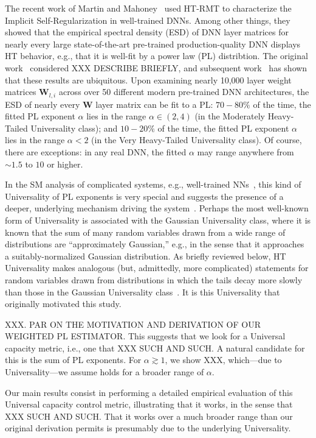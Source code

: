 The recent work of Martin and Mahoney~\cite{MM18_TR} used HT-RMT to characterize the Implicit Self-Regularization in well-trained DNNs.
Among other things, they showed that the empirical spectral density (ESD) of DNN layer matrices for nearly every large state-of-the-art pre-trained production-quality DNN displays HT behavior, e.g., that it is well-fit by a power law (PL) distribtion.
%
The original work~\cite{MM18_TR} considered 
XXX DESCRIBE BRIEFLY, 
and subsequent work~\cite{MM18_unpub_work} has shown that these results are ubiquitous. 
Upon examining nearly 10,000 layer weight matrices $\mathbf{W}_{l,i}$ across over 50 different modern pre-trained DNN architectures, the ESD of nearly every $\mathbf{W}$ layer matrix can be fit to a PL:
$70-80\%$ of the time, the fitted PL exponent $\alpha$ lies in the range $\alpha\in(2,4)$ (in the Moderately Heavy-Tailed Universality class); and
$10-20\%$ of the time, the fitted PL exponent $\alpha$ lies in the range $\alpha< 2$ (in the Very Heavy-Tailed Universality class).
Of course, there are exceptions: in any real DNN, the fitted $\alpha$ may range anywhere from $\sim 1.5$ to $10$ or higher.  

In the SM analysis of complicated systems, e.g., well-trained NNs~\cite{EB01_BOOK,nishimori01}, this kind of Universality of PL exponents is very special and suggests the presence of a deeper, underlying mechanism driving the system~\cite{SornetteBook,BouchaudPotters03}. 
Perhaps the most well-known form of Universality is associated with the Gaussian Universality class, where it is known that the sum of many random variables drawn from a wide range of distributions are ``approximately Gaussian,'' e.g., in the sense that it approaches a suitably-normalized Gaussian distribution.
As briefly reviewed below, HT Universality makes analogous (but, admittedly, more complicated) statements for random variables drawn from distributions in which the tails decay more slowly than those in the Gaussian Universality class~\cite{XXX-XXX,XXX-XXX}.
It is this Universality that originally motivated this study.

XXX.  PAR ON THE MOTIVATION AND DERIVATION OF OUR WEIGHTED PL ESTIMATOR.
This suggests that we look for a Universal capacity metric, i.e., one that XXX SUCH AND SUCH.
A natural candidate for this is the sum of PL exponents.
For $\alpha \gtrsim 1$, we show XXX, which---due to Universality---we assume holds for a broader range of $\alpha$.

Our main results consist in performing a detailed empirical evaluation of this Universal capacity control metric, illustrating that it works, in the sense that XXX SUCH AND SUCH.
That it works over a much broader range than our original derivation permits is presumably due to the underlying Universality.

